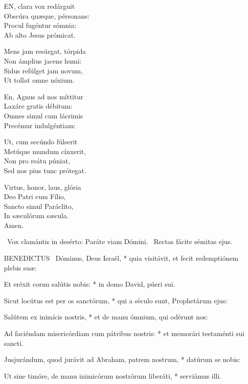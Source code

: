 
\lettrine[lines=2]{E}{N}, clara vox redárguit\\
Obscúra quæque, pérsonans:\\
Procul fugéntur sómnia:\\
Ab alto Jesus prómicat.

Mens jam resúrgat, tórpida\\
Non ámplius jacens humi:\\
Sidus refúlget jam novum,\\
Ut tollat omne nóxium.

En, Agnus ad nos míttitur\\
Laxáre gratis débitum:\\
Omnes simul cum lácrimis\\
Precémur indulgéntiam:

Ut, cum secúndo fúlserit\\
Metúque mundum cínxerit,\\
Non pro reátu púniat,\\
Sed nos pius tunc prótegat.

Virtus, honor, laus, glória\\
Deo Patri cum Fílio,\\
Sancto simul Paráclito,\\
In sæculórum sæcula.\\
Amen.

\sectionornament
\label{p:11}

\V\ Vox clamántis in desérto: Paráte viam Dómini. \R\ Rectas fácite sémitas ejus.



\lettrine[lines=2]{B}{ENEDICTUS} \textdagger\ Dóminus, Deus Israël, * quia visitávit, et fecit redemptiónem plebis suæ:

Et eréxit cornu salútis nobis: * in domo David, púeri sui.

Sicut locútus est per os sanctórum, * qui a século sunt, Prophetárum ejus:

Salútem ex inimícis nostris, * et de manu ómnium, qui odérunt nos:

Ad faciéndam misericórdiam cum pátribus nostris: * et memorári testaménti sui sancti.

Jusjurándum, quod jurávit ad Abraham, patrem nostrum, * datúrum se nobis:

Ut sine timóre, de manu inimicórum nostrórum liberáti, * serviámus illi.

